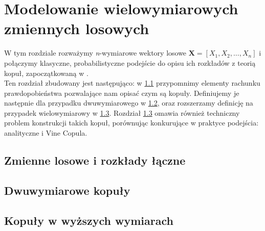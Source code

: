 \chapter{Modelowanie wielowymiarowych zmiennych losowych}

W tym rozdziale rozważymy \textit{n}-wymiarowe wektory losowe $\mathbf{X} = [X_1, X_2, \dots, X_n]$ i połączymy klasyczne, probabilistyczne podejście do opisu ich rozkładów z teorią kopuł, zapoczątkowaną w \cite{Sklar_Theorem}.\\
Ten rozdział zbudowany jest następująco: w \ref{sec:rozklady_laczne} przypomnimy elementy rachunku prawdopobieństwa pozwalające nam opisać czym są kopuły. Definiujemy je następnie dla przypadku dwuwymiarowego w \ref{sec:dwuwymiarowe_kopuly}, oraz rozszerzamy definicję na przypadek wielowymiarowy w \ref{sec:kopuly_w_wyzszych_wymiarach}. Rozdział \ref{sec:kopuly_w_wyzszych_wymiarach} omawia również techniczny problem konstrukcji takich kopuł, porównując konkurujące w praktyce podejścia: analityczne i Vine Copula.\\

\section{Zmienne losowe i rozkłady łączne}
\label{sec:rozklady_laczne}


\section{Dwuwymiarowe kopuły}
\label{sec:dwuwymiarowe_kopuly}


\section{Kopuły w wyższych wymiarach}
\label{sec:kopuly_w_wyzszych_wymiarach}

		
\mgrclosechapter